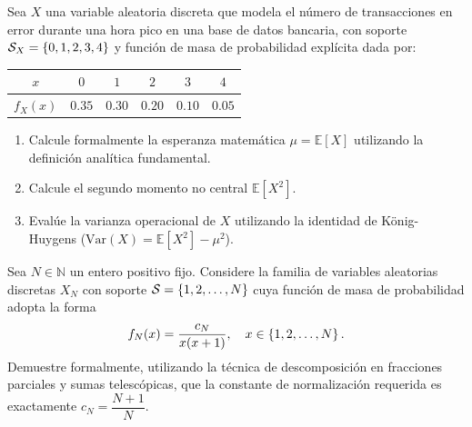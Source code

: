 \begin{problema}
	\label{prob:c324c4f}
	Sea $X$ una variable aleatoria discreta que modela el número de transacciones en error durante una hora pico en una base de datos bancaria, con soporte $\mathcal{S}_X = \left\{ 0, 1, 2, 3, 4 \right\}$ y función de masa de probabilidad explícita dada por:
	\begin{center}
		\begin{tabular}{c|ccccc}
			\hline
			$x$ & $0$ & $1$ & $2$ & $3$ & $4$ \\
			\hline
			$f_X(x)$ & $0.35$ & $0.30$ & $0.20$ & $0.10$ & $0.05$ \\
			\hline
		\end{tabular}
	\end{center}
	\begin{enumerate}
		\item Calcule formalmente la esperanza matemática $\mu = \mathbb{E}[X]$ utilizando la definición analítica fundamental.
		\item Calcule el segundo momento no central $\mathbb{E}[X^2]$.
		\item Evalúe la varianza operacional de $X$ utilizando la identidad de König-Huygens ($\text{Var}(X) = \mathbb{E}[X^2] - \mu^2$).
	\end{enumerate}
\end{problema}

\begin{problema}
	\label{prob:cb2247c}
	Sea $N \in \mathbb{N}$ un entero positivo fijo. Considere la familia de variables aleatorias discretas $X_N$ con soporte $\mathcal{S} = \left\{ 1, 2, \dots, N \right\}$ cuya función de masa de probabilidad adopta la forma
	\begin{align*}
		f_N(x) = \frac{c_N}{x(x+1)}, \quad x \in \left\{ 1, 2, \dots, N \right\}.
	\end{align*}
	Demuestre formalmente, utilizando la técnica de descomposición en fracciones parciales y sumas telescópicas, que la constante de normalización requerida es exactamente $c_N = \dfrac{N+1}{N}$.
\end{problema}

